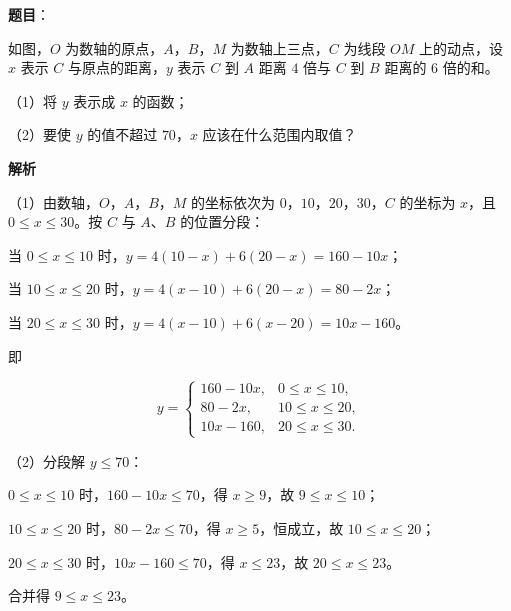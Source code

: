 \begin{answer}

\textbf{题目}：

如图，$O$ 为数轴的原点，$A$，$B$，$M$ 为数轴上三点，$C$ 为线段 $OM$ 上的动点，设 $x$ 表示 $C$ 与原点的距离，$y$ 表示 $C$ 到 $A$ 距离 $4$ 倍与 $C$ 到 $B$ 距离的 $6$ 倍的和。

（1）将 $y$ 表示成 $x$ 的函数；

（2）要使 $y$ 的值不超过 $70$，$x$ 应该在什么范围内取值？
\nopagebreak[4]
\begin{center}\end{center}
\nopagebreak[4]
\textbf{解析}

（1）由数轴，$O$，$A$，$B$，$M$ 的坐标依次为 $0$，$10$，$20$，$30$，$C$ 的坐标为 $x$，且 $0\leqslant x\leqslant30$。按 $C$ 与 $A$、$B$ 的位置分段：

当 $0\leqslant x\leqslant10$ 时，$y=4(10-x)+6(20-x)=160-10x$；

当 $10\leqslant x\leqslant20$ 时，$y=4(x-10)+6(20-x)=80-2x$；

当 $20\leqslant x\leqslant30$ 时，$y=4(x-10)+6(x-20)=10x-160$。

即

\nopagebreak[4]
\[y=\begin{cases}160-10x,&0\leqslant x\leqslant10,\\ 80-2x,&10\leqslant x\leqslant20,\\ 10x-160,&20\leqslant x\leqslant30.\end{cases}\]

（2）分段解 $y\leqslant70$：

$0\leqslant x\leqslant10$ 时，$160-10x\leqslant70$，得 $x\geqslant9$，故 $9\leqslant x\leqslant10$；

$10\leqslant x\leqslant20$ 时，$80-2x\leqslant70$，得 $x\geqslant5$，恒成立，故 $10\leqslant x\leqslant20$；

$20\leqslant x\leqslant30$ 时，$10x-160\leqslant70$，得 $x\leqslant23$，故 $20\leqslant x\leqslant23$。

合并得 $9\leqslant x\leqslant23$。


\end{answer}